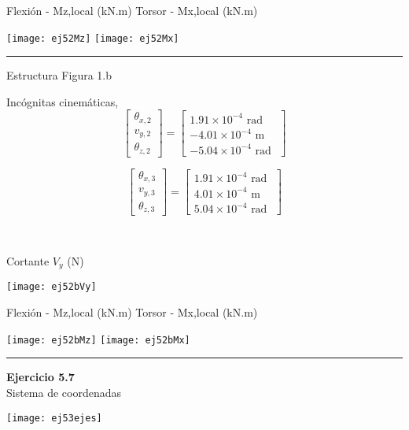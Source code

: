 Flexión - Mz,local (kN.m) \hfill  Torsor - Mx,local (kN.m)

\texttt{[image: ej52Mz]}
\texttt{[image: ej52Mx]}


\hrule 

\vspace{5mm}
Estructura Figura 1.b



\begin{minipage}{0.45\textwidth}
	Incógnitas cinemáticas,
	$$
	\left[
	\begin{matrix}
	\theta_{x,2} \\
	v_{y,2} \\
	\theta_{z,2}
	\end{matrix}
	\right]
	=
	\left[
	\begin{matrix}
	 1.91\times 10^{-4} \text{ rad }\\
	-4.01\times 10^{-4} \text{ m }\\
	-5.04\times 10^{-4} \text{ rad }
	\end{matrix}
	\right]
	$$
	
	$$
	\left[
	\begin{matrix}
	\theta_{x,3} \\
	v_{y,3} \\
	\theta_{z,3}
	\end{matrix}
	\right]
	=
	\left[
	\begin{matrix}
	 1.91\times 10^{-4} \text{ rad }\\
	 4.01\times 10^{-4} \text{ m }\\
	 5.04\times 10^{-4} \text{ rad }
	\end{matrix}
	\right]
	$$
\end{minipage}
~
\begin{minipage}{0.45\textwidth}
	Cortante $V_y$ (N)
	
	\texttt{[image: ej52bVy]}
\end{minipage}


Flexión - Mz,local (kN.m) \hfill Torsor - Mx,local (kN.m)

\texttt{[image: ej52bMz]}
\texttt{[image: ej52bMx]}



\hrule 
\vspace{5mm}
\textbf{Ejercicio 5.7}\\



Sistema de coordenadas
\begin{center}
	\texttt{[image: ej53ejes]}
\end{center}




